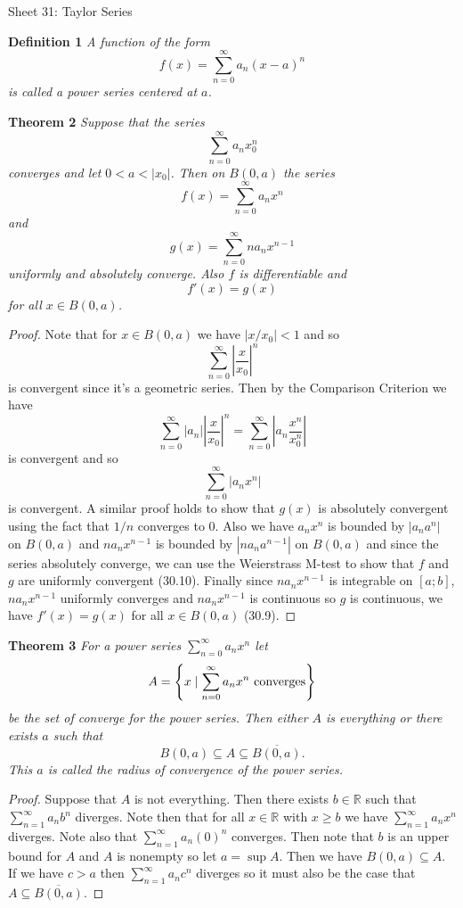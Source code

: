 \documentclass{article}
\begin{document}
\begin{flushleft}

\Large

Sheet 31: Taylor Series\newline

\normalsize

\textbf{Definition 1}
\textsl{A function of the form
\[
f(x) = \sum_{n=0}^{\infty} a_n (x-a)^n
\]
is called a power series centered at $a$.}\newline

\textbf{Theorem 2}
\textsl{Suppose that the series
\[
\sum_{n=0}^{\infty} a_n x_0^n
\]
converges and let $0 < a < |x_0|$. Then on $B(0,a)$ the series
\[
f(x) = \sum_{n=0}^{\infty} a_n x^n
\]
and
\[
g(x) = \sum_{n=0}^{\infty} n a_n x^{n-1}
\]
uniformly and absolutely converge. Also $f$ is differentiable and
\[
f'(x) = g(x)
\]
for all $x \in B(0,a)$.}
\begin{proof}
Note that for $x \in B(0,a)$ we have $|x/x_0| < 1$ and so
\[
\sum_{n=0}^{\infty} \left | \frac{x}{x_0} \right |^n
\]
is convergent since it's a geometric series. Then by the Comparison Criterion we have
\[
\sum_{n=0}^{\infty} |a_n| \left | \frac{x}{x_0} \right |^n = \sum_{n=0}^{\infty} \left | a_n \frac{x^n}{x_0^n} \right |
\]
is convergent and so
\[
\sum_{n=0}^{\infty} |a_n x^n|
\]
is convergent. A similar proof holds to show that $g(x)$ is absolutely convergent using the fact that $1/n$ converges to $0$. Also we have $a_n x^n$ is bounded by $|a_n a^n|$ on $B(0,a)$ and $n a_n x^{n-1}$ is bounded by $|n a_n a^{n-1}|$ on $B(0,a)$ and since the series absolutely converge, we can use the Weierstrass M-test to show that $f$ and $g$ are uniformly convergent (30.10). Finally since $n a_n x^{n-1}$ is integrable on $[a;b]$, $n a_n x^{n-1}$ uniformly converges and $n a_n x^{n-1}$ is continuous so $g$ is continuous, we have $f'(x) = g(x)$ for all $x \in B(0,a)$ (30.9).
\end{proof}

\textbf{Theorem 3}
\textsl{For a power series $\sum_{n=0}^{\infty} a_n x^n$ let
\[
A = \left \{ x \mid \sum_{n=0}^{\infty} a_n x^n \textup{ converges} \right \}
\]
be the set of converge for the power series. Then either $A$ is everything or there exists $a$ such that
\[
B(0,a) \subseteq A \subseteq \overline{B(0,a)}.
\]
This $a$ is called the radius of convergence of the power series.}
\begin{proof}
Suppose that $A$ is not everything. Then there exists $b \in \mathbb{R}$ such that $\sum_{n=1}^{\infty} a_n b^n$ diverges. Note then that for all $x \in \mathbb{R}$ with $x \geq b$ we have $\sum_{n=1}^{\infty} a_n x^n$ diverges. Note also that $\sum_{n=1}^{\infty} a_n (0)^n$ converges. Then note that $b$ is an upper bound for $A$ and $A$ is nonempty so let $a = \sup A$. Then we have $B(0,a) \subseteq A$. If we have $c > a$ then $\sum_{n=1}^{\infty} a_n c^n$ diverges so it must also be the case that $A \subseteq \overline{B(0,a)}$.
\end{proof}


\end{flushleft}
\end{document}

